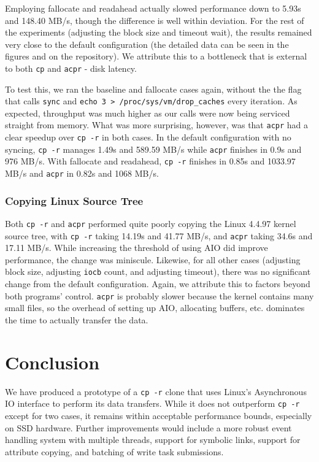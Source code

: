 \documentclass[11pt]{article}
\begin{document}
Employing fallocate and readahead actually slowed performance down to 5.93s and 148.40 MB/s, though the difference is well within deviation. For the rest of the experiments (adjusting the block size and timeout wait), the results remained very close to the default configuration (the detailed data can be seen in the figures and on the repository). We attribute this to a bottleneck that is external to both \texttt{cp} and \texttt{acpr} - disk latency. 

To test this, we ran the baseline and fallocate cases again, without the the flag that calls \texttt{sync} and \texttt{echo 3 > /proc/sys/vm/drop\_caches} every iteration. As expected, throughput was much higher as our calls were now being serviced straight from memory. What was more surprising, however, was that \texttt{acpr} had a clear speedup over \texttt{cp -r} in both cases. In the default configuration with no syncing, \texttt{cp -r} manages 1.49s and 589.59 MB/s while \texttt{acpr} finishes in 0.9s and 976 MB/s. With fallocate and readahead, \texttt{cp -r} finishes in 0.85s and 1033.97 MB/s and \texttt{acpr} in 0.82s and 1068 MB/s.

\subsubsection{Copying Linux Source Tree}
Both \texttt{cp -r} and \texttt{acpr} performed quite poorly copying the Linux 4.4.97 kernel source tree, with \texttt{cp -r} taking 14.19s and 41.77 MB/s, and \texttt{acpr} taking 34.6s and 17.11 MB/s. While increasing the threshold of using AIO did improve performance, the change was miniscule. Likewise, for all other cases (adjusting block size, adjusting \texttt{iocb} count, and adjusting timeout), there was no significant change from the default configuration. Again, we attribute this to factors beyond both programs' control. \texttt{acpr} is probably slower because the kernel contains many small files, so the overhead of setting up AIO, allocating buffers, etc. dominates the time to actually transfer the data.

\section{Conclusion}
We have produced a prototype of a \texttt{cp -r} clone that uses Linux's Asynchronous IO interface to perform its data transfers. While it does not outperform \texttt{cp -r} except for two cases, it remains within acceptable performance bounds, especially on SSD hardware. Further improvements would include a more robust event handling system with multiple threads, support for symbolic links, support for attribute copying, and batching of write task submissions.
\end{document}
